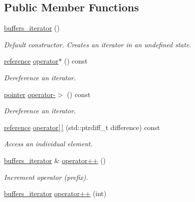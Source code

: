 \subsection*{Public Member Functions}
\begin{DoxyCompactItemize}
\item 
\hyperlink{classasio_1_1buffers__iterator_a2b7db145f92fa5ff7afda660897e0e5f}{buffers\+\_\+iterator} ()
\begin{DoxyCompactList}\small\item\em Default constructor. Creates an iterator in an undefined state. \end{DoxyCompactList}\item 
\hyperlink{classasio_1_1buffers__iterator_aa57e1b880d781aa295f143cb4f5db61d}{reference} \hyperlink{classasio_1_1buffers__iterator_ac8ffae7237b9fdd160c4851825569ff1}{operator$\ast$} () const 
\begin{DoxyCompactList}\small\item\em Dereference an iterator. \end{DoxyCompactList}\item 
\hyperlink{classasio_1_1buffers__iterator_a15f732e586b13d7b0d23b5b2ea3b3cb9}{pointer} \hyperlink{classasio_1_1buffers__iterator_aa9f11b710ba710d331ccb68839571e9e}{operator-\/$>$} () const 
\begin{DoxyCompactList}\small\item\em Dereference an iterator. \end{DoxyCompactList}\item 
\hyperlink{classasio_1_1buffers__iterator_aa57e1b880d781aa295f143cb4f5db61d}{reference} \hyperlink{classasio_1_1buffers__iterator_ae49272d79e59152e08eb8db7e793b644}{operator\mbox{[}$\,$\mbox{]}} (std\+::ptrdiff\+\_\+t difference) const 
\begin{DoxyCompactList}\small\item\em Access an individual element. \end{DoxyCompactList}\item 
\hyperlink{classasio_1_1buffers__iterator}{buffers\+\_\+iterator} \& \hyperlink{classasio_1_1buffers__iterator_a74729bf795967bc402ad2623fbff1017}{operator++} ()
\begin{DoxyCompactList}\small\item\em Increment operator (prefix). \end{DoxyCompactList}\item 
\hyperlink{classasio_1_1buffers__iterator}{buffers\+\_\+iterator} \hyperlink{classasio_1_1buffers__iterator_aebce55aaa8c6e999085ef090b46cc17c}{operator++} (int)

\end{DoxyCompactItemize}
